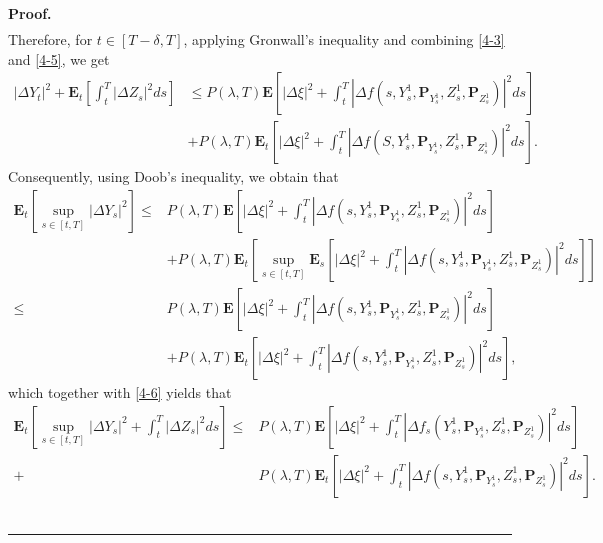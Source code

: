 \documentclass[10pt]{article}%
\numberwithin{equation}{section}
\newenvironment{proof}[1][Proof]{\noindent \textbf{#1.} }{\  \rule{0.5em}{0.5em}}
\def \E{\mathbf{E}}
\def \P{\mathbf{P}}
\begin{document}
\begin{proof}
\begin{equation}
\begin{split}
     \end{split}
 \end{equation}
 Therefore, for $t\in [T-\delta,T]$, applying Gronwall's inequality and combining \eqref{4-3} and \eqref{4-5}, we get 
  \begin{equation}
     \begin{split}\label{4-6}
        \left|\Delta Y_t\right|^2+\E_t\left[\int_{t}^{T}\left|\Delta Z_s\right|^2 ds\right]
         &\leq P(\lambda,T)\E\left[\left|\Delta\xi\right|^2+\int_{t}^{T}\left|\Delta f(s,Y_s^1,\P_{Y_s^1},Z_s^1,\P_{Z_s^1})\right|^2ds\right]\\
         &+ P(\lambda,T)\E_t\left[\left|\Delta\xi\right|^2+\int_{t}^{T}\left|\Delta f(S,Y_s^1,\P_{Y_s^1},Z_s^1,\P_{Z_s^1})\right|^2ds\right].
     \end{split}
 \end{equation}
 Consequently, using Doob's inequality, we obtain that 
 \begin{equation*}
     \begin{split}\label{4-7}
        \E_t\left[\sup_{s\in[t,T]}\left|\Delta Y_s\right|^2\right]
         \leq& P(\lambda,T)\E\left[\left|\Delta\xi\right|^2+\int_{t}^{T}\left|\Delta f(s,Y_s^1,\P_{Y_s^1},Z_s^1,\P_{Z_s^1})\right|^2ds\right]\\
         &+ P(\lambda,T)\E_t\left[\sup_{s\in[t,T]}\E_s\left[\left|\Delta\xi\right|^2+\int_{t}^{T}\left|\Delta f(s,Y_s^1,\P_{Y_s^1},Z_s^1,\P_{Z_s^1})\right|^2ds\right]\right]\\
         \leq& P(\lambda,T)\E\left[\left|\Delta\xi\right|^2+\int_{t}^{T}\left|\Delta f(s,Y_s^1,\P_{Y_s^1},Z_s^1,\P_{Z_s^1})\right|^2ds\right]\\
         &+ P(\lambda,T)\E_t\left[ \left|\Delta\xi\right|^2+\int_{t}^{T}\left|\Delta f(s,Y_s^1,\P_{Y_s^1},Z_s^1,\P_{Z_s^1})\right|^2ds\right],
     \end{split}
 \end{equation*}
 which together with \eqref{4-6} yields that 
 \begin{equation}
     \begin{split}\label{4-8}
        \E_t\left[\sup_{s\in[t,T]}\left|\Delta Y_s\right|^2+\int_{t}^{T}\left|\Delta Z_s\right|^2 ds\right]
         \leq& P(\lambda,T)\E\left[\left|\Delta\xi\right|^2+\int_{t}^{T}\left|\Delta f_s(Y_s^1,\P_{Y_s^1},Z_s^1,\P_{Z_s^1})\right|^2ds\right]\\
         +& P(\lambda,T)\E_t\left[\left|\Delta\xi\right|^2+\int_{t}^{T}\left|\Delta f(s,Y_s^1,\P_{Y_s^1},Z_s^1,\P_{Z_s^1})\right|^2ds\right].
     \end{split}

\end{equation}
\end{proof}
\end{document}
